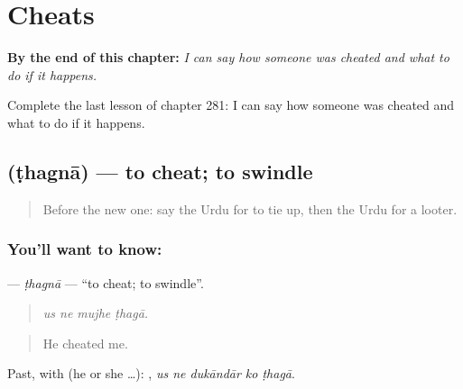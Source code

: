 
\chapter{Cheats}
\label{ch:ur-cheats}

\begin{chapteropening}
\textbf{By the end of this chapter:} \emph{I can say how someone was cheated and what to do if it happens.}

Complete the last lesson of chapter 281: I can say how someone was cheated and what to do if it happens.
\end{chapteropening}

\section[\texorpdfstring{\ur{ٹھگنا} (ṭhagnā)}{ٹھگنا (ṭhagnā)}]{ (ṭhagnā) — to cheat; to swindle}

\label{lesson:UR-C281-thagna}



\begin{quote}
Before the new one: say the Urdu for to tie up, then the Urdu for a looter.
\end{quote}

\subsection*{You'll want to know: }
\textbf{} — \emph{ṭhagnā} — \textquotedblleft{}to cheat; to swindle\textquotedblright{}.

\begin{quote}
   
\end{quote}

\begin{quote}
\emph{us ne mujhe ṭhagā.}
\end{quote}

\begin{quote}
He cheated me.
\end{quote}

Past, with  (he or she …):     , \emph{us ne dukāndār ko ṭhagā}.

